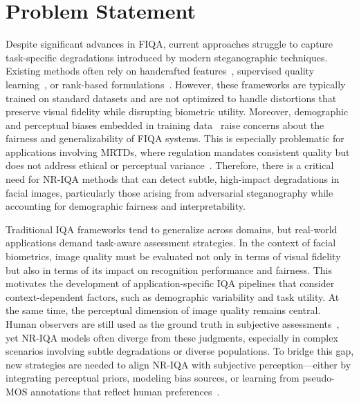 \section{Problem Statement}\label{sec:problem_statement}

Despite significant advances in FIQA, current approaches struggle to capture task-specific degradations introduced by modern steganographic techniques. Existing methods often rely on handcrafted features~\cite{henniger2020biosig}, supervised quality learning~\cite{hernandez2019faceqnet, meng2021magface, terhorst2020serfiq}, or rank-based formulations~\cite{liu2017rankiqa}. However, these frameworks are typically trained on standard datasets and are not optimized to handle distortions that preserve visual fidelity while disrupting biometric utility. Moreover, demographic and perceptual biases embedded in training data~\cite{babnik2022} raise concerns about the fairness and generalizability of FIQA systems. This is especially problematic for applications involving MRTDs, where regulation mandates consistent quality but does not address ethical or perceptual variance~\cite{icao_2015, iso_iec29794-5_2010}. Therefore, there is a critical need for NR-IQA methods that can detect subtle, high-impact degradations in facial images, particularly those arising from adversarial steganography while accounting for demographic fairness and interpretability.

Traditional IQA frameworks tend to generalize across domains, but real-world applications demand task-aware assessment strategies. In the context of facial biometrics, image quality must be evaluated not only in terms of visual fidelity but also in terms of its impact on recognition performance and fairness. This motivates the development of application-specific IQA pipelines that consider context-dependent factors, such as demographic variability and task utility. At the same time, the perceptual dimension of image quality remains central. Human observers are still used as the ground truth in subjective assessments~\cite{ITU-R-BT500, mos2016}, yet NR-IQA models often diverge from these judgments, especially in complex scenarios involving subtle degradations or diverse populations. To bridge this gap, new strategies are needed to align NR-IQA with subjective perception—either by integrating perceptual priors, modeling bias sources, or learning from pseudo-MOS annotations that reflect human preferences~\cite{chen2021pseudo, jin2020pipal}.


